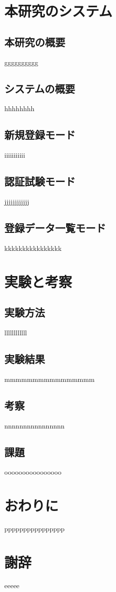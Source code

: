 \documentclass[11pt]{jreport}
\begin{document}
\chapter{本研究のシステム}
	\section{本研究の概要}
	gggggggggg
	\section{システムの概要}
	hhhhhhhh
	\section{新規登録モード}
	iiiiiiiiiii
	\section{認証試験モード}
	jjjjjjjjjjjj
	\section{登録データ一覧モード}
	kkkkkkkkkkkkkkkk
\chapter{実験と考察}
	\section{実験方法}
	llllllllllll
	\section{実験結果}
	mmmmmmmmmmmmmmmm
	\section{考察}
	nnnnnnnnnnnnnnnn
	\section{課題}
	oooooooooooooooo
\chapter{おわりに}
pppppppppppppppp

\chapter*{謝辞}
eeeee
\end{document}
